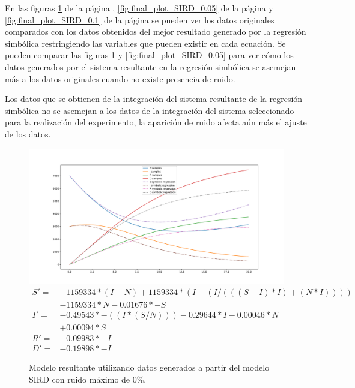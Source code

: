 En las figuras \ref{fig:final_plot_SIRD_0.0} de la página \pageref{fig:final_plot_SIRD_0.0}, \ref{fig:final_plot_SIRD_0.05} de la página \pageref{fig:final_plot_SIRD_0.05} y \ref{fig:final_plot_SIRD_0.1} de la página \pageref{fig:final_plot_SIRD_0.1} se pueden ver los datos originales comparados con los datos obtenidos del mejor resultado generado por la regresión simbólica restringiendo las variables que pueden existir en cada ecuación. Se pueden comparar las figuras \ref{fig:final_plot_SIRD_0.0} y \ref{fig:final_plot_SIRD_0.05} para ver cómo los datos generados por el sistema resultante en la regresión simbólica se asemejan más a los datos originales cuando no existe presencia de ruido.

Los datos que se obtienen de la integración del sistema resultante de la regresión simbólica no se asemejan a los datos de la integración del sistema seleccionado para la realización del experimento, la aparición de ruido afecta aún más el ajuste de los datos.

\begin{figure}[h]
    \centering
    \includegraphics[width=\textwidth]{"figures/final_plot_SIRD_0.0.pdf"}
    \begin{align*}
        S' = & -1159334 * (I - N) + 1159334 * (I + (I / (((S - I) * I) + (N * I)))) \\
             & -1159334 * N -0.01676 * -S                                           \\
        I' = & -0.49543 * -((I * (S / N))) -0.29644 * I -0.00046 * N                \\
             & + 0.00094 * S                                                        \\
        R' = & -0.09983 * -I                                                        \\
        D' = & -0.19898 * -I
    \end{align*}
    \caption{Modelo resultante utilizando datos generados a partir del modelo SIRD con ruido máximo de 0\%.}
    \label{fig:final_plot_SIRD_0.0}
\end{figure}

